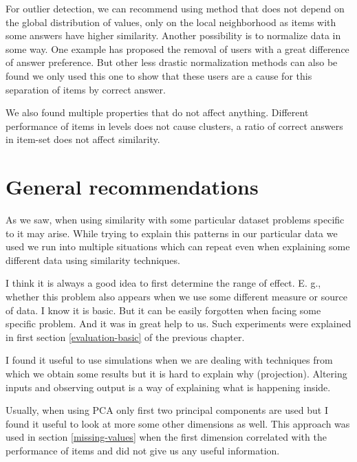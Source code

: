 \documentclass[
  digital, %
  table,   %
  nolof,     %
  nolot,     %
  nocover,
  color,
  final, %
]{fithesis3}
\begin{document}
For outlier detection, we can recommend using method that does not depend on the global distribution of values, only on the local neighborhood as items with some answers have higher similarity. Another possibility is to normalize data in some way. One example has proposed the removal of users with a great difference of answer preference. But other less drastic normalization methods can also be found we only used this one to show that these users are a cause for this separation of items by correct answer.


We also found multiple properties that do not affect anything. Different performance of items in levels does not cause clusters, a ratio of correct answers in item-set does not affect similarity. %


\section{General recommendations}\label{general-recommendations}

As we saw, when using similarity with some particular dataset problems specific to it may arise. While trying to explain this patterns in our particular data we used we run into multiple situations which can repeat even when explaining some different data using similarity techniques.


I think it is always a good idea to first determine the range of effect. E. g., whether this problem also appears when we use some different measure or source of data. I know it is basic. But it can be easily forgotten when facing some specific problem. And it was in great help to us. Such experiments were explained in first section \ref{evaluation-basic} of the previous chapter.


I found it useful to use simulations when we are dealing with techniques from which we obtain some results but it is hard to explain why (projection). Altering inputs and observing output is a way of explaining what is happening inside.


Usually, when using PCA only first two principal components are used but I found it useful to look at more some other dimensions as well. This approach was used in section \ref{missing-values} when the first dimension correlated with the performance of items and did not give us any useful information.
\end{document}

